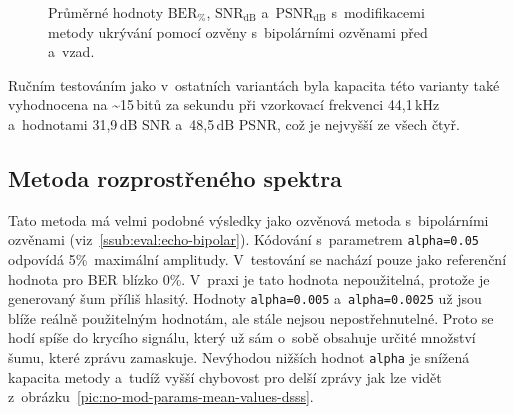 \begin{figure}[H]
    \table
    \centering
    \caption{Průměrné hodnoty $\mathrm{BER}_{\%}$, $\mathrm{SNR}_\mathrm{dB}$
    a~$\mathrm{PSNR}_\mathrm{dB}$ s~modifikacemi metody ukrývání pomocí
    ozvěny s~bipolárními ozvěnami před a~vzad.}
    \label{pic:modifications-mean-values-echo-bipolar-bf}
\end{figure}

Ručním testováním jako v~ostatních variantách byla kapacita této varianty také
vyhodnocena na \textasciitilde15\,bitů za sekundu při vzorkovací frekvenci
44,1\,kHz a~hodnotami 31,9\,dB SNR a~48,5\,dB PSNR, což je nejvyšší ze všech
čtyř.

\subsection*{Metoda rozprostřeného spektra}

Tato metoda má velmi podobné výsledky jako ozvěnová metoda s~bipolárními
ozvěnami (viz~\ref{ssub:eval:echo-bipolar}). Kódování s~parametrem
\texttt{alpha=0.05} odpovídá 5\%~maximální amplitudy. V~testování se nachází
pouze jako referenční hodnota pro BER blízko 0\%. V~praxi je tato hodnota
nepoužitelná, protože je generovaný šum příliš hlasitý. Hodnoty
\texttt{alpha=0.005} a~\texttt{alpha=0.0025} už jsou blíže reálně použitelným
hodnotám, ale stále nejsou nepostřehnutelné. Proto se hodí spíše do krycího
signálu, který už sám o~sobě obsahuje určité množství šumu, které zprávu
zamaskuje. Nevýhodou nižších hodnot \texttt{alpha} je snížená kapacita metody
a~tudíž vyšší chybovost pro delší zprávy jak lze vidět
z~obrázku~\ref{pic:no-mod-params-mean-values-dsss}.

